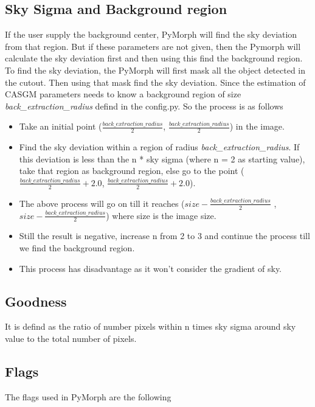 \documentclass[a4paper,12pt]{article}
\begin{document}
\subsection{Sky Sigma and Background region}
If the user supply the background center, PyMorph will find the sky deviation from that region. But if these
 parameters are not given, then the Pymorph will calculate the sky deviation first and then using this find the background region. To find the sky deviation, the PyMorph will first mask all the object detected in the cutout. Then
 using that mask find the sky deviation. Since the estimation of CASGM parameters needs to know a background region of size \textit{back\_extraction\_radius} defind in the config.py. So the process is as follows
\begin{itemize}
\item Take an initial point ($\frac{back\_extraction\_radius}{2}$, $\frac{back\_extraction\_radius}{2}$) in the image.
\item Find the sky deviation within a region of radius \textit{back\_extraction\_radius}. If this deviation is less than the n * sky sigma (where n = 2 as starting value), take that region as background region, else go to the point ($\frac{back\_extraction\_radius}{2} + 2.0$, $\frac{back\_extraction\_radius}{2} + 2.0$).
\item The above process will go on till it reaches ($size - \frac{back\_extraction\_radius}{2}$ , $size - \frac{back\_extraction\_radius}{2}$) where size is the image size.
\item Still the result is negative, increase n from 2 to 3 and continue the process till we find the background region.
\item This process has disadvantage as it won't consider the gradient of sky.
\end{itemize}
\subsection*{Goodness}
It is defind as the ratio of number pixels within n times sky sigma around sky value to the total number of pixels.

\subsection{Flags}
The flags used in PyMorph are the following
\end{document}
